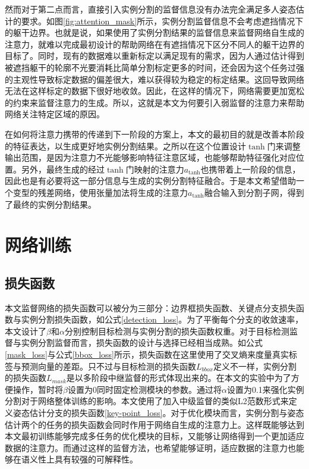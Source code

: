 然而对于第二点而言，直接引入实例分割的监督信息没有办法完全满足多人姿态估计的要求。如图\ref{fig:attention_mask}所示，实例分割监督信息不会考虑遮挡情况下的躯干边界。也就是说，如果使用了实例分割结果的监督信息来监督网络自生成的注意力，就难以完成最初设计的帮助网络在有遮挡情况下区分不同人的躯干边界的目标了。同时，现有的数据难以重新标定以满足现有的需求，因为人通过估计得到被遮挡躯干的轮廓不光要消耗比简单分割标定更多的时间，还会因为这个任务过强的主观性导致标定数据的偏差很大，难以获得较为稳定的标定结果。这回导致网络无法在这样标定的数据下很好地收敛。因此，在这样的情况下，网络需要更加宽松的约束来监督注意力的生成。所以，这就是本文为何要引入弱监督的注意力来帮助网络关注特定区域的原因。

在如何将注意力携带的传递到下一阶段的方案上，本文的最初目的就是改善本阶段的特征表达，以生成更好地实例分割结果。之所以在这个位置设计$\tanh$门来调整输出范围，是因为注意力不光能够影响特征注意区域，也能够帮助特征强化对应位置。另外，最终生成的经过$\tanh$门映射的注意力$a_{\tanh}$也携带着上一阶段的信息，因此也是有必要将这一部分信息与生成的实例分割特征融合。于是本文希望借助一个变型的残差网络，使用张量加法将生成的注意力$a_{\tanh}$融合输入到分割子网，得到了最终的实例分割结果。


\section{网络训练}
\label{sec:training}
\subsection{损失函数}
\label{subsec:lossfunction}

本文监督网络的损失函数可以被分为三部分：边界框损失函数、关键点分支损失函数与实例分割损失函数，如公式\eqref{detection_loss}。为了平衡每个分支的收敛速率，本文设计了$\beta$和$\alpha$分别控制目标检测与实例分割的损失函数权重。对于目标检测监督与实例分割监督而言，损失函数的设计与选择已经相当成熟。如公式\eqref{mask_loss}与公式\eqref{bbox_loss}所示，损失函数在这里使用了交叉熵来度量真实标签与预测向量的差距。只不过与目标检测的损失函数$L_{bbox}$定义不一样，实例分割的损失函数$L_{mask}$是以多阶段中继监督的形式体现出来的。在本文的实验中为了方便操作，暂时将$\beta$设置为0同时固定检测模块的参数。通过将$\alpha$设置为0.1来强化实例分割对于网络整体训练的影响。本文使用了加入中级监督的类似L2范数形式来定义姿态估计分支的损失函数\eqref{key-point_loss}。对于优化模块而言，实例分割与姿态估计两个的任务的损失函数会同时作用于网络自生成的注意力上。这样既能够达到本文最初训练能够完成多任务的优化模块的目标，又能够让网络得到一个更加适应数据的注意力。而通过这样的监督方法，也希望能够证明，适应数据的注意力也能够在语义性上具有较强的可解释性。

